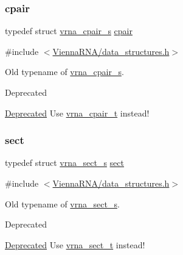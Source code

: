\subsubsection{\texorpdfstring{cpair}{cpair}}
{\footnotesize\ttfamily typedef struct \hyperlink{group__data__structures_structvrna__cpair__s}{vrna\+\_\+cpair\+\_\+s} \hyperlink{group__data__structures_ga8412f116a2eb07b59ade9e14ca7c5ef1}{cpair}}



{\ttfamily \#include $<$\hyperlink{data__structures_8h}{Vienna\+R\+N\+A/data\+\_\+structures.\+h}$>$}



Old typename of \hyperlink{group__data__structures_structvrna__cpair__s}{vrna\+\_\+cpair\+\_\+s}. 

\begin{DoxyRefDesc}{Deprecated}
\item[\hyperlink{deprecated__deprecated000048}{Deprecated}]Use \hyperlink{group__data__structures_gae4fc91141cc69c6d8eaf1332cb991ecc}{vrna\+\_\+cpair\+\_\+t} instead! \end{DoxyRefDesc}
\mbox{\label{group__data__structures_gaaacedee1f05d3d45aa6764eca51a8876}} 
\subsubsection{\texorpdfstring{sect}{sect}}
{\footnotesize\ttfamily typedef struct \hyperlink{group__data__structures_structvrna__sect__s}{vrna\+\_\+sect\+\_\+s} \hyperlink{group__data__structures_gaaacedee1f05d3d45aa6764eca51a8876}{sect}}



{\ttfamily \#include $<$\hyperlink{data__structures_8h}{Vienna\+R\+N\+A/data\+\_\+structures.\+h}$>$}



Old typename of \hyperlink{group__data__structures_structvrna__sect__s}{vrna\+\_\+sect\+\_\+s}. 

\begin{DoxyRefDesc}{Deprecated}
\item[\hyperlink{deprecated__deprecated000049}{Deprecated}]Use \hyperlink{group__data__structures_gacc9cdae790dac75a7024e7069c0d4400}{vrna\+\_\+sect\+\_\+t} instead! \end{DoxyRefDesc}
\mbox{\label{group__data__structures_gaaeed53a7508c6ce549a98223e94b25df}} 
